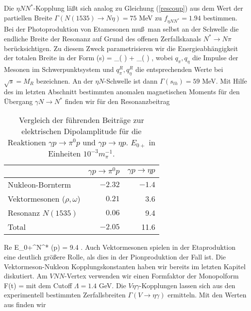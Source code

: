 Die $\eta NN^{*}$-Kopplung l\"a\ss t sich analog zu Gleichung (\ref{rescoup})
aus dem Wert der partiellen Breite $\Gamma (N(1535) \to N\eta)=75$ MeV
zu $f_{\eta NN^{*}}=1.94$ bestimmen. Bei der Photoproduktion von 
Etamesonen mu\ss\ man selbst an der Schwelle die endliche Breite der
Resonanz auf Grund des offenen Zerfallskanals $N^{*}\to N\pi$
ber\"ucksichtigen. Zu diesem Zweck  parametrisieren wir die 
Energieabh\"angigkeit der totalen Breite in der Form
\be
 \Gamma (s) = \Gamma_\pi \left( \right)
   + \Gamma_\eta \left(  \right) \; ,
\ee
wobei $q_\pi,q_\eta$ die Impulse der Mesonen im Schwerpunktsystem
und $q_\pi^R,q_\eta^R$ die entsprechenden Werte bei $\sqrt{s}=M_R$
bezeichnen. An der $\eta N$-Schwelle ist dann $\Gamma (s_{th})=59$
MeV. Mit Hilfe des im letzten Abschnitt bestimmten anomalen magnetischen
Moments f\"ur den \"Ubergang $\gamma N \to N^{*}$ finden wir
f\"ur den Resonanzbeitrag
\begin{table}
\caption{Vergleich der f\"uhrenden Beitr\"age zur elektrischen
Dipolamplitude f\"ur die Reaktionen $\gamma p \to \pi^0 p$ und 
$\gamma p \to \eta p$. $E_{0+}$ in Einheiten $10^{-3} m_\pi^{-1}$.}
\begin{center}
\begin{tabular}{|l||r|r|}\hline
               & $\gamma p\to \pi^0 p$  &  $\gamma p\to \eta p$ \\ \hline\hline
 Nukleon-Bornterm               & $ -2.32$& $-1.4$              \\
 Vektormesonen ($\rho,\omega$)  & $0.21$  &  3.6	         \\
 Resonanz $N(1535)$             & $0.06$  &   9.4                \\
 Total                          & $-2.05$ &  11.6                 \\ \hline
\end{tabular}
\end{center}    
\end{table}
\be
  {\rm Re} E_{0+}^{N^{*}} (\eta p) = 9.4  \su .
\ee
Auch Vektormesonen spielen in der Etaproduktion eine deutlich
gr\"o\ss ere Rolle, als dies in der Pionproduktion der Fall ist.
Die Vektormeson-Nukleon Kopplungskonstanten haben wir bereits im
letzten Kapitel diskutiert. Am $VNN$-Vertex verwenden wir einen 
Formfaktor der Monopolform
\be
 F(t) = 
\ee
mit dem Cutoff $\Lambda=1.4$ GeV. Die $V\eta\gamma$-Kopplungen lassen sich
aus den experimentell bestimmten Zerfallsbreiten $\Gamma (V\to\eta
\gamma )$ ermitteln. Mit den Werten  aus \cite{Dum82} finden wir  
